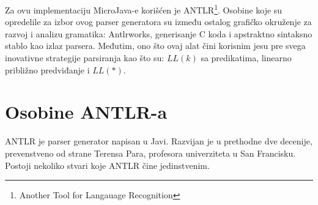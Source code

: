 Za ovu implementaciju MicroJava-e korišćen je ANTLR\footnote{\skr \eng Another Tool for Langauage Recognition}.
Osobine koje su opredelile za izbor ovog parser generatora su između ostalog grafičko okruženje za razvoj i analizu gramatika: Antlrworks, generisanje C koda i apstraktno sintaksno stablo kao izlaz parsera.
Međutim, ono što ovaj alat čini korisnim jesu pre svega inovativne strategije parsiranja kao što su: $LL(k)$ sa predikatima\cite{pred-llk}, linearno približno predviđanje\cite{parr-thesis} i $LL(*)$\cite{ll*}.

\section{Osobine ANTLR-a}

ANTLR je parser generator napisan u Javi. 
Razvijan je u prethodne dve decenije, prevenstveno od strane Terensa Para, profesora univerziteta u San Francisku.
Postoji nekoliko stvari koje ANTLR čine jedinstvenim.
